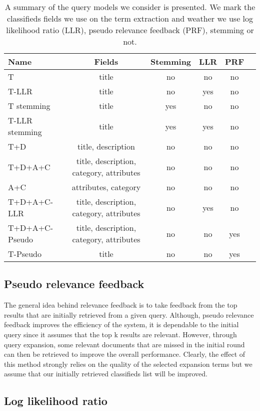 \begin{table}[H]
\begin{center}
\scriptsize
\caption{A summary of the query models we consider is presented. We mark the classifieds fields we use on the term extraction and weather we use log likelihood ratio (LLR), pseudo relevance feedback (PRF), stemming or not.}
\label{table:QueryFields}
\begin{tabular}{lccccr}
\midrule
Name & Fields & Stemming & LLR & PRF \\
\midrule
T & title & no & no & no \\
T-LLR & title & no & yes & no \\
T stemming & title & yes & no & no \\
T-LLR stemming & title & yes & yes & no \\
T+D  & title, description & no & no & no \\
T+D+A+C & title, description, category, attributes & no & no & no \\
A+C & attributes, category & no & no & no \\
T+D+A+C-LLR & title, description, category, attributes & no & yes & no \\
T+D+A+C-Pseudo & title, description, category, attributes & no & no & yes \\
T-Pseudo & title & no & no & yes\\
\bottomrule
\end{tabular}
\end{center}
\end{table}

\subsection{Pseudo relevance feedback}

The general idea behind relevance feedback is to take feedback from the top results that are initially retrieved from a given query. Although, pseudo relevance feedback improves the efficiency of the system, it is dependable to the initial query since it assumes that the top k results are relevant. However, through query expansion, some relevant documents that are missed in the initial round can then be retrieved to improve the overall performance. Clearly, the effect of this method strongly relies on the quality of the selected expansion terms but we assume that our initially retrieved classifieds list will be improved. 

\subsection{Log likelihood ratio}

